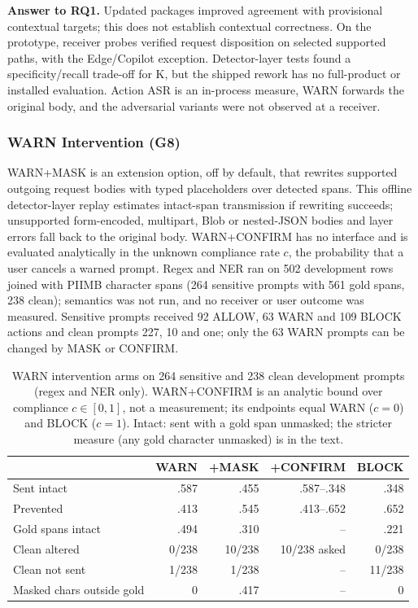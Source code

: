 \documentclass[sigconf]{acmart}
\theoremstyle{acmdefinition}\newtheorem{property}{Property}
\begin{document}
\textbf{Answer to RQ1.} Updated packages improved agreement with provisional contextual targets; this does not establish contextual correctness. On the prototype, receiver probes verified request disposition on selected supported paths, with the Edge/Copilot exception. Detector-layer tests found a specificity/recall trade-off for K, but the shipped rework has no full-product or installed evaluation. Action ASR is an in-process measure, WARN forwards the original body, and the adversarial variants were not observed at a receiver.

\subsubsection{WARN Intervention (G8)}
\label{sec:eval_warn}
WARN+MASK is an extension option, off by default, that rewrites supported outgoing request bodies with typed placeholders over detected spans. This offline detector-layer replay estimates intact-span transmission if rewriting succeeds; unsupported form-encoded, multipart, Blob or nested-JSON bodies and layer errors fall back to the original body. WARN+CONFIRM has no interface and is evaluated analytically in the unknown compliance rate $c$, the probability that a user cancels a warned prompt. Regex and NER ran on 502 development rows joined with PIIMB character spans (264 sensitive prompts with 561 gold spans, 238 clean); semantics was not run, and no receiver or user outcome was measured. Sensitive prompts received 92 ALLOW, 63 WARN and 109 BLOCK actions and clean prompts 227, 10 and one; only the 63 WARN prompts can be changed by MASK or CONFIRM.

\begin{table}[t]
\centering
\caption{WARN intervention arms on 264 sensitive and 238 clean development prompts (regex and NER only). WARN+CONFIRM is an analytic bound over compliance $c\in[0,1]$, not a measurement; its endpoints equal WARN ($c=0$) and BLOCK ($c=1$). Intact: sent with a gold span unmasked; the stricter measure (any gold character unmasked) is in the text.}
\label{tab:warn}
\small
\setlength{\tabcolsep}{3pt}
\begin{tabular}{p{}rrrr}
\toprule
 & WARN & +MASK & +CONFIRM & BLOCK \\
\midrule
Sent intact & .587 & .455 & .587--.348 & .348 \\
Prevented & .413 & .545 & .413--.652 & .652 \\
Gold spans intact & .494 & .310 & -- & .221 \\
Clean altered & 0/238 & 10/238 & 10/238 asked & 0/238 \\
Clean not sent & 1/238 & 1/238 & -- & 11/238 \\
Masked chars outside gold & 0 & .417 & -- & 0 \\
\bottomrule
\end{tabular}
\end{table}
\end{document}
